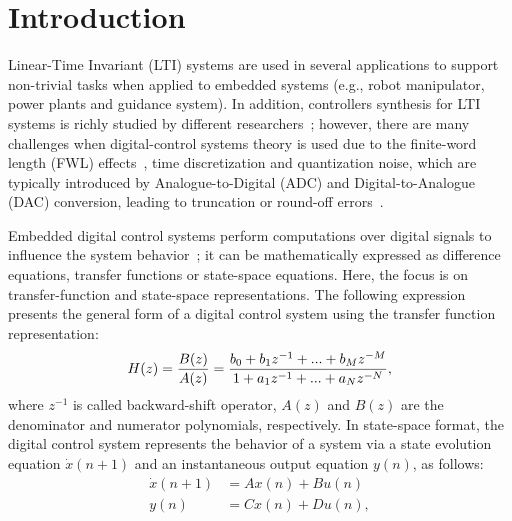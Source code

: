 \documentclass[sigconf]{acmart}
\begin{document}

\maketitle

\section{Introduction}

Linear-Time Invariant (LTI) systems are used in several applications
to support non-trivial tasks when applied to embedded systems 
(e.g., robot manipulator, power plants and guidance system). 
In addition, controllers synthesis for LTI systems is richly studied 
by different researchers~\cite{mazo2010pessoa,DBLP:conf/emsoft/RavanbakhshS16,economakos2016automated}; 
however, there are many challenges when 
digital-control systems theory is used due to the finite-word 
length (FWL) effects~\cite{Guang2013, Istepanian2001}, time discretization 
and quantization noise, which are typically introduced by Analogue-to-Digital 
(ADC) and Digital-to-Analogue (DAC) conversion, leading to truncation 
or round-off errors~\cite{astrom1997computer}. 

Embedded digital control systems perform computations over digital signals 
to influence the system behavior~\cite{Ogata2001}; it can be mathematically 
expressed as difference equations, transfer functions or state-space equations. 
Here, the focus is on transfer-function and state-space representations. 
The following expression presents the general form of a digital control system 
using the transfer function representation:
%
\begin{equation}
\small
\label{eq:transferfunction}
H(z)=\frac{B(z)}{A(z)}=\frac{b_{0}+b_{1}z^{-1}+...+b_{M}z^{-M}}{1+a_{1}z^{-1}+...+a_{N}z^{-N}},
\end{equation}
%
\noindent where $z^{-1}$ is called backward-shift operator, $A(z)$ and $B(z)$ are 
the denominator and numerator polynomials, respectively.
%
In state-space format, the digital control system represents the behavior 
of a system via a state evolution equation $\dot{x}(n+1)$ and an instantaneous 
output equation $y(n)$, as follows:
%
\begin{equation}
\begin{split}
\dot{x}(n+1) &= A x(n) + B u(n)
\\
y(n) &= C x(n) + D u(n), 
\end{split}\label{eq:ss-example}
\end{equation}
\end{document}
